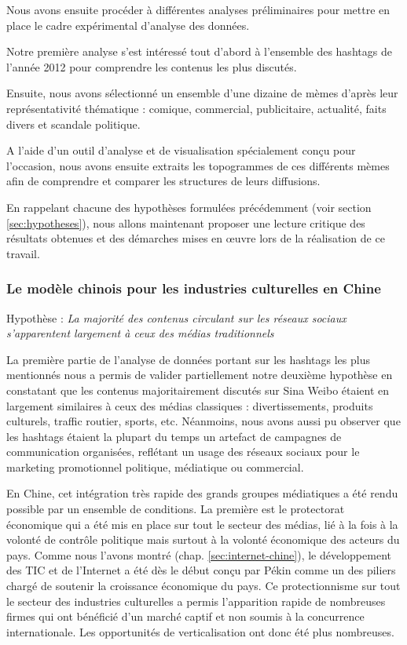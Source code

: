 Nous avons ensuite procéder à différentes analyses préliminaires pour mettre en place le cadre expérimental d'analyse des données.

Notre première analyse s{\textquoteright}est intéressé tout d{\textquoteright}abord à l{\textquoteright}ensemble des hashtags de l{\textquoteright}année 2012 pour comprendre les contenus les plus discutés. 

Ensuite, nous avons sélectionné un ensemble d{\textquoteright}une dizaine de mèmes d{\textquoteright}après leur représentativité thématique : comique, commercial, publicitaire, actualité, faits divers et scandale politique. 

A l{\textquoteright}aide d{\textquoteright}un outil d{\textquoteright}analyse et de visualisation spécialement con\c{c}u pour l{\textquoteright}occasion, nous avons ensuite extraits les topogrammes de ces différents mèmes afin de comprendre et comparer les structures de leurs diffusions.


En rappelant chacune des hypothèses formulées précédemment (voir section \ref{sec:hypotheses}), nous allons maintenant proposer une lecture critique des résultats obtenues et des démarches mises en œuvre lors de la réalisation de ce travail. 

\subsubsection{Le modèle chinois pour les industries culturelles en Chine} 

Hypothèse : \textit{La majorité des contenus circulant sur les réseaux sociaux s'apparentent largement à ceux des médias traditionnels} 

La première partie de l{\textquoteright}analyse de données portant sur les hashtags les plus mentionnés nous a permis de valider partiellement notre deuxième hypothèse en constatant que les contenus majoritairement discutés sur Sina Weibo étaient en largement similaires à ceux des médias classiques : divertissements, produits culturels, traffic routier, sports, etc. Néanmoins, nous avons aussi pu observer que les hashtags étaient la plupart du temps un artefact de campagnes de communication organisées, reflétant un usage des réseaux sociaux pour le marketing promotionnel politique, médiatique ou commercial. 

En Chine, cet intégration très rapide des grands groupes médiatiques a été rendu possible par un ensemble de conditions. La première est le protectorat économique qui a été mis en place sur tout le secteur des médias, lié à la fois à la volonté de contrôle politique mais surtout à la volonté économique des acteurs du pays. Comme nous l'avons montré (chap. \ref{sec:internet-chine}), le développement des TIC et de l'Internet a été dès le début conçu par Pékin comme un des piliers chargé de soutenir la croissance économique du pays. Ce protectionnisme sur tout le secteur des industries culturelles a permis l'apparition rapide de nombreuses firmes qui ont bénéficié d'un marché captif et non soumis à la concurrence internationale. Les opportunités de verticalisation ont donc été plus nombreuses. 

